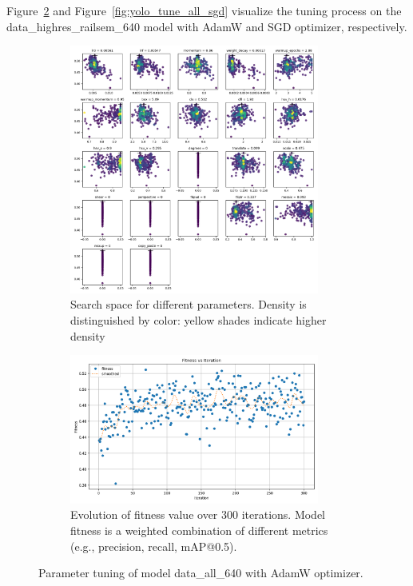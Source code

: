\documentclass[Master,MDS,english]{BASE/twbook} %
\begin{document}
Figure~\ref{fig:yolo_tune_all_adam} and Figure~\ref{fig:yolo_tune_all_sgd} visualize the tuning process on the data\_highres\_railsem\_640 model  with AdamW and SGD optimizer, respectively.

\begin{figure}
\centering
\begin{subfigure}[t]{.5\textwidth}
  \centering
  \includegraphics[width=0.9\textwidth]{images/yolo/all/adam/tune_scatter_plots}
  \caption{Search space for different parameters. Density is distinguished by color: yellow shades indicate higher density}
\end{subfigure}%
\begin{subfigure}[t]{.5\textwidth}
  \centering
  \includegraphics[width=0.9\textwidth]{images/yolo/all/adam/tune_fitness}
  \caption{Evolution of fitness value over 300 iterations. Model fitness is a weighted combination of different metrics (e.g., precision, recall, mAP@0.5).}
  \label{fig:images_from_videos}
\end{subfigure}
\caption{Parameter tuning of model data\_all\_640 with AdamW optimizer.}
\label{fig:yolo_tune_all_adam}
\end{figure}
\end{document}
